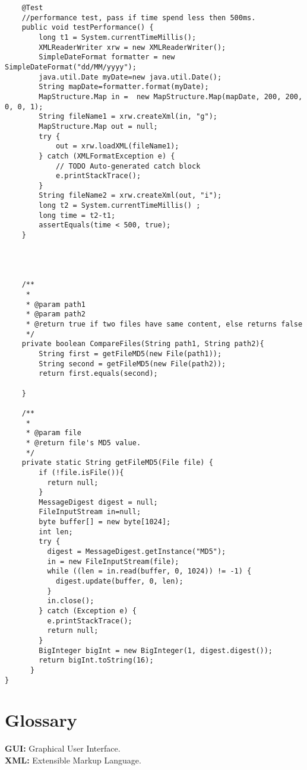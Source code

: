 \documentclass[12pt, a4paper]{report}
\begin{document}
\begin{lstlisting}
	@Test
	//performance test, pass if time spend less then 500ms.
	public void testPerformance() {
		long t1 = System.currentTimeMillis();
		XMLReaderWriter xrw = new XMLReaderWriter();
		SimpleDateFormat formatter = new SimpleDateFormat("dd/MM/yyyy");  
	   	java.util.Date myDate=new java.util.Date();
	   	String mapDate=formatter.format(myDate); 
	   	MapStructure.Map in =  new MapStructure.Map(mapDate, 200, 200, 0, 0, 1);
		String fileName1 = xrw.createXml(in, "g");
		MapStructure.Map out = null;
		try {
			out = xrw.loadXML(fileName1);
		} catch (XMLFormatException e) {
			// TODO Auto-generated catch block
			e.printStackTrace();
		}
		String fileName2 = xrw.createXml(out, "i");
		long t2 = System.currentTimeMillis() ;
		long time = t2-t1;
		assertEquals(time < 500, true);
	}
	
	
	
	
	/**
	 * 
	 * @param path1
	 * @param path2
	 * @return true if two files have same content, else returns false
	 */
	private boolean CompareFiles(String path1, String path2){
		String first = getFileMD5(new File(path1));
		String second = getFileMD5(new File(path2));
		return first.equals(second);
		
	}
	
	/**
	 * 
	 * @param file
	 * @return file's MD5 value.
	 */
	private static String getFileMD5(File file) {
	    if (!file.isFile()){
	      return null;
	    }
	    MessageDigest digest = null;
	    FileInputStream in=null;
	    byte buffer[] = new byte[1024];
	    int len;
	    try {
	      digest = MessageDigest.getInstance("MD5");
	      in = new FileInputStream(file);
	      while ((len = in.read(buffer, 0, 1024)) != -1) {
	        digest.update(buffer, 0, len);
	      }
	      in.close();
	    } catch (Exception e) {
	      e.printStackTrace();
	      return null;
	    }
	    BigInteger bigInt = new BigInteger(1, digest.digest());
	    return bigInt.toString(16);
	  }	
}

\end{lstlisting} 

\chapter{Glossary} %
\label{cha:glossary}
\textbf{GUI: } Graphical User Interface.\\
\textbf{XML: } Extensible Markup Language.

\end{document}
